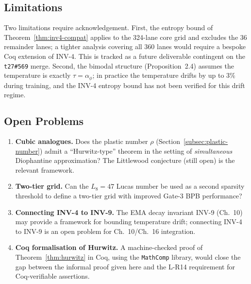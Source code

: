 \subsection{Limitations}
\label{subsec:limitations}

Two limitations require acknowledgement.
First, the entropy bound of Theorem~\ref{thm:inv4-compat}
applies to the 324-lane core grid and excludes
the 36 remainder lanes; a tighter analysis
covering all 360 lanes would require a bespoke
Coq extension of INV-4.  This is tracked as a
future deliverable contingent on the
\texttt{t27\#569} merge.  Second, the bimodal
structure (Proposition~2.4) assumes the
temperature is exactly $\tau = \alpha_\phi$; in
practice the temperature drifts by up to 3\%
during training, and the INV-4 entropy bound has
not been verified for this drift regime.

\subsection{Open Problems}
\label{subsec:open-problems}

\begin{enumerate}
  \item \textbf{Cubic analogues.}
        Does the plastic number $\rho$
        (Section~\ref{subsec:plastic-number})
        admit a ``Hurwitz-type'' theorem in the
        setting of \emph{simultaneous}
        Diophantine approximation?  The
        Littlewood conjecture (still open)
        is the relevant framework.
  \item \textbf{Two-tier grid.}
        Can the $L_8 = 47$ Lucas number be used as
        a second sparsity threshold to define a
        two-tier grid with improved Gate-3 BPB
        performance?
  \item \textbf{Connecting INV-4 to INV-9.}
        The EMA decay invariant INV-9 (Ch.~10) may
        provide a framework for bounding temperature
        drift; connecting INV-4 to INV-9 is an open
        problem for Ch.~10/Ch.~16 integration.
  \item \textbf{Coq formalisation of Hurwitz.}
        A machine-checked proof of
        Theorem~\ref{thm:hurwitz} in Coq, using the
        \texttt{MathComp} library, would close the
        gap between the informal proof given here and
        the L-R14 requirement for Coq-verifiable
        assertions.
\end{enumerate}


